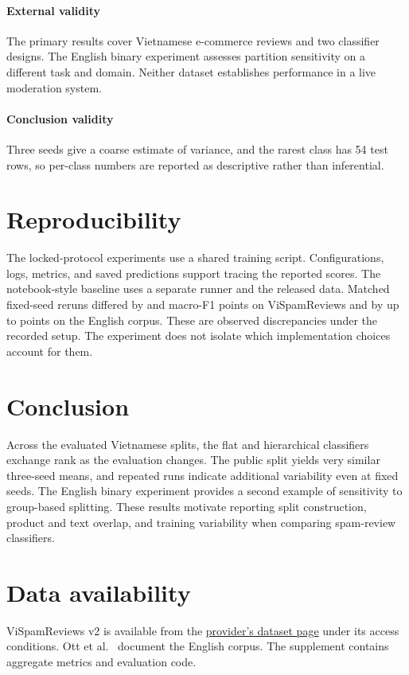 \documentclass[12pt,a4paper]{article}
\newcommand{\vispam}{ViSpamReviews}
\begin{document}
\paragraph{External validity} The primary results cover Vietnamese e-commerce reviews and two classifier designs. The English binary experiment assesses partition sensitivity on a different task and domain. Neither dataset establishes performance in a live moderation system.

\paragraph{Conclusion validity} Three seeds give a coarse estimate of variance, and the rarest class has 54 test rows, so per-class numbers are reported as descriptive rather than inferential.

\section{Reproducibility}
The locked-protocol experiments use a shared training script. Configurations, logs, metrics, and saved predictions support tracing the reported scores. The notebook-style baseline uses a separate runner and the released data. Matched fixed-seed reruns differed by \RepeatFlat{} and \RepeatCascade{} macro-F1 points on \vispam{} and by up to \RepeatOtt{} points on the English corpus. These are observed discrepancies under the recorded setup. The experiment does not isolate which implementation choices account for them.

\section{Conclusion}
Across the evaluated Vietnamese splits, the flat and hierarchical classifiers exchange rank as the evaluation changes. The public split yields very similar three-seed means, and repeated runs indicate additional variability even at fixed seeds. The English binary experiment provides a second example of sensitivity to group-based splitting. These results motivate reporting split construction, product and text overlap, and training variability when comparing spam-review classifiers.

\section*{Data availability}
ViSpamReviews v2 is available from the \href{https://huggingface.co/datasets/sonlam1102/vispamdetection2}{provider's dataset page} under its access conditions. Ott et al.\ \cite{ott2011} document the English corpus. The supplement contains aggregate metrics and evaluation code.
\end{document}
